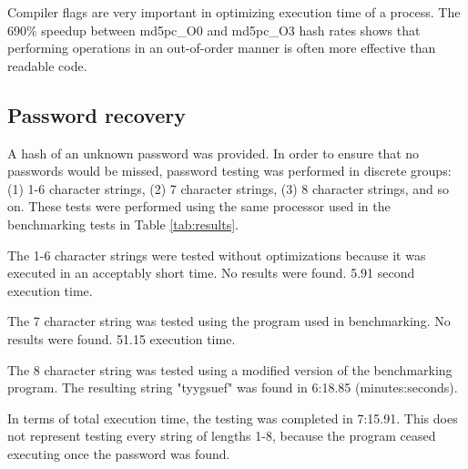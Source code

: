 		Compiler flags are very important in optimizing execution time of a process. The 690\% speedup between md5pc\_O0 and md5pc\_O3 hash rates shows that performing operations in an out-of-order manner is often more effective than readable code. 

	\subsection{Password recovery}
		A hash of an unknown password was provided. In order to ensure that no passwords would be missed, password testing was performed in discrete groups: (1) 1-6 character strings, (2) 7 character strings, (3) 8 character strings, and so on. These tests were performed using the same processor used in the benchmarking tests in Table \ref{tab:results}. 

		The 1-6 character strings were tested without optimizations because it was executed in an acceptably short time. No results were found. 5.91 second execution time. 

		The 7 character string was tested using the program used in benchmarking. No results were found. 51.15 execution time.

		The 8 character string was tested using a modified version of the benchmarking program. The resulting string "tyygsuef" was found in 6:18.85 (minutes:seconds). 

		In terms of total execution time, the testing was completed in 7:15.91. This does not represent testing every string of lengths 1-8, because the program ceased executing once the password was found. 